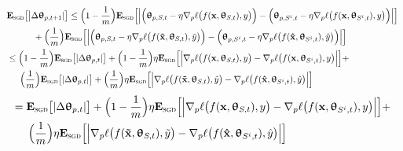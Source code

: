 \documentclass{article}
\begin{document}
\begin{equation}~\label{eq:sgd_terms}
\begin{split}
& \mathbf{E}_{\textsc{sgd}}  \big[\big|\Delta \bm{\uptheta}_{p, t+1} | \big]   \leq \Big(1-\frac{1}{m}\Big) \mathbf{E}_{\textsc{sgd}}  \Big[ \Big| \Big(\bm{\uptheta}_{p, S, t}  - \eta  \nabla_{p} \ell\big(f(\mathbf{x},\bm{\uptheta}_{  S, t}),y \big) \Big) -  \Big(\bm{\uptheta}_{p, S^i, t}   - \eta  \nabla_{p} \ell\big(f(\mathbf{x},\bm{\uptheta}_{  S^{i}, t}), y \big) \Big) \Big| \Big]  \\ & \hspace{3em}  + \Big(\frac{1}{m}  \Big) \mathbf{E}_{\textsc{sgd}}  \Big[ \Big| \Big(\bm{\uptheta}_{p, S, t}    - \eta  \nabla_{p} \ell\big(f(\mathbf{\tilde{x}},\bm{\uptheta}_{  S,t}), \tilde{y} \big) \Big)  -   \Big(\bm{\uptheta}_{p, S^i, t}   - \eta  \nabla_{p} \ell\big(f(\mathbf{\hat{x}} ,\bm{\uptheta}_{S^{i}, t}), \hat{y} \big) \Big) \Big| \Big]  \\
& \leq \Big(1-\frac{1}{m}\Big) \mathbf{E}_{\textsc{sgd}}  \big[|\Delta \bm{\uptheta}_{p, t} | \big] + \Big(1-\frac{1}{m}\Big) \eta\mathbf{E}_{\textsc{sgd}}  \Big[ \Big|   \nabla_{p} \ell\big(f(\mathbf{x},\bm{\uptheta}_{ S, t}),y \big)   -    \nabla_{p}
\ell\big(f(\mathbf{x},\bm{\uptheta}_{  S^{i}, t}),y\big)  \Big| \Big]  + \\ & \hspace{1.5em} \Big(\frac{1}{m}\Big) \mathbf{E}_{\textsc{sgd}}  \big[|\Delta \bm{\uptheta}_{p, t} | \big]  +  \Big(\frac{1}{m}\Big) \eta\mathbf{E}_{\textsc{sgd}}  \Big[ \Big|   \nabla_{p} \ell\big(f(\mathbf{\tilde{x}} ,\bm{\uptheta}_{ S, t}), \tilde{y}  \big)   -  \nabla_{p} \ell\big(f(\mathbf{\hat{x}} ,\bm{\uptheta}_{ S^{i}, t}),\hat{y}  \big)  \Big| \Big]  \\ 
\end{split}
\end{equation}
\begin{equation*}
\begin{split}
& = \mathbf{E}_{\textsc{sgd}}  \big[|\Delta \bm{\uptheta}_{p, t} | \big] +   \Big(1-\frac{1}{m}\Big) \eta\mathbf{E}_{\textsc{sgd}}  \Big[ \Big|   \nabla_{p} \ell\big(f(\mathbf{x},\bm{\uptheta}_{  S, t}),y \big)   -      \nabla_{p} \ell\big(f(\mathbf{x},\bm{\uptheta}_{  S^{i}, t}),y\big)   \Big| \Big]   + \\ &    \hspace{1.5em}  \Big(\frac{1}{m}\Big) \eta\mathbf{E}_{\textsc{sgd}}  \Big[ \Big|   \nabla_{p} \ell\big(f(\mathbf{\tilde{x}} ,\bm{\uptheta}_{  S, t}), \tilde{y}  \big)   -   \nabla_{p} \ell\big(f(\mathbf{\hat{x}} ,\bm{\uptheta}_{  S^{i}, t}), \hat{y}  \big)  \Big| \Big]    \\ 
\end{split}
\end{equation*} \\
\end{document}
